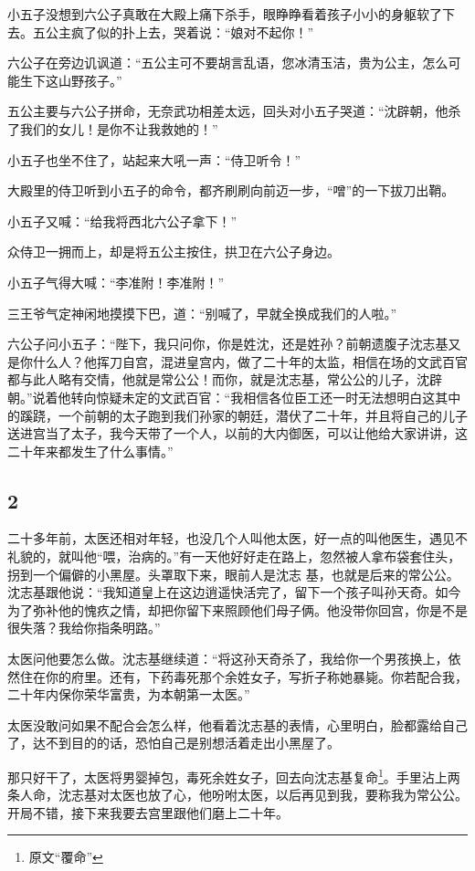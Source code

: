 小五子没想到六公子真敢在大殿上痛下杀手，眼睁睁看着孩子小小的身躯软了下去。五公主疯了似的扑上去，哭着说：“娘对不起你！”

六公子在旁边讥讽道：“五公主可不要胡言乱语，您冰清玉洁，贵为公主，怎么可能生下这山野孩子。”

五公主要与六公子拼命，无奈武功相差太远，回头对小五子哭道：“沈辟朝，他杀了我们的女儿！是你不让我救她的！”

小五子也坐不住了，站起来大吼一声：“侍卫听令！”

大殿里的侍卫听到小五子的命令，都齐刷刷向前迈一步，“噌”的一下拔刀出鞘。

小五子又喊：“给我将西北六公子拿下！”

众侍卫一拥而上，却是将五公主按住，拱卫在六公子身边。

小五子气得大喊：“李准附！李准附！”

三王爷气定神闲地摸摸下巴，道：“别喊了，早就全换成我们的人啦。”

六公子问小五子：“陛下，我只问你，你是姓沈，还是姓孙？前朝遗腹子沈志基又是你什么人？他挥刀自宫，混进皇宫内，做了二十年的太监，相信在场的文武百官都与此人略有交情，他就是常公公！而你，就是沈志基，常公公的儿子，沈辟朝。”说着他转向惊疑未定的文武百官：“我相信各位臣工还一时无法想明白这其中的蹊跷，一个前朝的太子跑到我们孙家的朝廷，潜伏了二十年，并且将自己的儿子送进宫当了太子，我今天带了一个人，以前的大内御医，可以让他给大家讲讲，这二十年来都发生了什么事情。”
\newline

{\centering\subsection{2}}

二十多年前，太医还相对年轻，也没几个人叫他太医，好一点的叫他医生，遇见不礼貌的，就叫他“喂，治病的。”有一天他好好走在路上，忽然被人拿布袋套住头，拐到一个偏僻的小黑屋。头罩取下来，眼前人是沈志
基，也就是后来的常公公。沈志基跟他说：“我知道皇上在这边逍遥快活完了，留下一个孩子叫孙天奇。如今为了弥补他的愧疚之情，却把你留下来照顾他们母子俩。他没带你回宫，你是不是很失落？我给你指条明路。”

太医问他要怎么做。沈志基继续道：“将这孙天奇杀了，我给你一个男孩换上，依然住在你的府里。还有，下药毒死那个余姓女子，写折子称她暴毙。你若配合我，二十年内保你荣华富贵，为本朝第一太医。”

太医没敢问如果不配合会怎么样，他看着沈志基的表情，心里明白，脸都露给自己了，达不到目的的话，恐怕自己是别想活着走出小黑屋了。

那只好干了，太医将男婴掉包，毒死余姓女子，回去向沈志基复命\footnote{原文“覆命”}。手里沾上两条人命，沈志基对太医也放了心，他吩咐太医，以后再见到我，要称我为常公公。开局不错，接下来我要去宫里跟他们磨上二十年。
\newline

